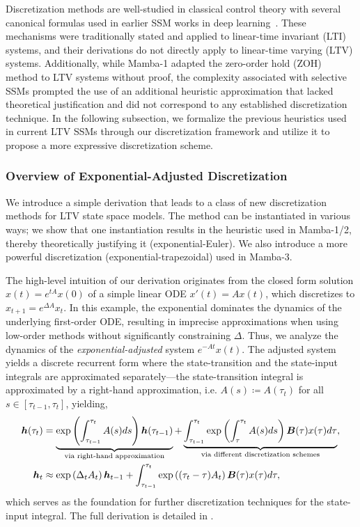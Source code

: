 Discretization methods are well-studied in classical control theory with several canonical formulas used in earlier SSM works in deep learning~\citep{S4,S4D,S5}.
These mechanisms were traditionally stated and applied to linear-time invariant (LTI) systems, and their derivations do not directly apply to linear-time varying (LTV) systems.
Additionally, while Mamba-1 adapted the zero-order hold (ZOH) method to LTV systems without proof, the complexity associated with selective SSMs prompted the use of an additional heuristic approximation that lacked theoretical justification and did not correspond to any established discretization technique.
In the following subsection, we formalize the previous heuristics used in current LTV SSMs through our discretization framework and utilize it to propose a more expressive discretization scheme.
\subsubsection{Overview of Exponential-Adjusted Discretization}
We introduce a simple derivation that leads to a class of new discretization methods for LTV state space models. The method can be instantiated in various ways; we show that one instantiation results in the heuristic used in Mamba-1/2, thereby theoretically justifying it (exponential-Euler). We also introduce a more powerful discretization (exponential-trapezoidal) used in Mamba-3.

The high-level intuition of our derivation originates from the closed form solution $x(t) = e^{tA}x(0)$ of a simple linear ODE $x'(t) = Ax(t)$, which discretizes to $x_{t+1} = e^{\Delta A}x_t$.
In this example, the exponential dominates the dynamics of the underlying first-order ODE, resulting in imprecise approximations when using low-order methods without significantly constraining $\Delta$.
Thus, we analyze the dynamics of the \emph{exponential-adjusted} system $e^{-At}x(t)$.
The adjusted system yields a discrete recurrent form where the state-transition and the state-input integrals are approximated separately---the state-transition integral is approximated by a right-hand approximation, i.e. $A(s) \coloneqq A(\tau_t)$ for all $s \in [\tau_{t-1},\tau_t]$, yielding,
\begin{align*}
    {\bm{h}}(\tau_t) &= \underbrace{\exp\left(\int_{\tau_{t-1}}^{\tau_t}A(s)ds\right){\bm{h}}(\tau_{t-1})}_\text{via right-hand approximation} + \underbrace{\int_{\tau_{t-1}}^{\tau_t} \exp\left(\int_{\tau}^{\tau_t}A(s)ds\right){\bm{B}}(\tau)x(\tau) d\tau}_\text{via different discretization schemes},
    \\
    {\bm{h}}_t &\approx \exp\left(\Delta_t A_t\right){\bm{h}}_{t-1} + \int_{\tau_{t-1}}^{\tau_t} \exp\left((\tau_t -\tau)A_t\right){\bm{B}}(\tau)x(\tau) d\tau,
\end{align*}
which serves as the foundation for further discretization techniques for the state-input integral. The full derivation is detailed in .

